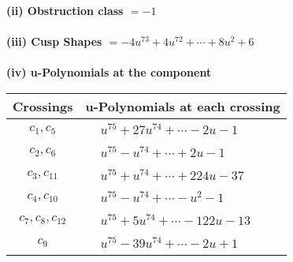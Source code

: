 \documentclass[1p]{elsarticle_modified}
\theoremstyle{definition}
\begin{document}
\flushleft \textbf{(ii) Obstruction class $= -1$}\\~\\
\flushleft \textbf{(iii) Cusp Shapes $= -4 u^{73}+4 u^{72}+\cdots+8 u^2+6$}\\~\\
\newpage\renewcommand{\arraystretch}{1}
\flushleft \textbf{(iv) u-Polynomials at the component}\newline \\
\begin{tabular}{m{50pt}|m{274pt}}
Crossings & \hspace{64pt}u-Polynomials at each crossing \\
\hline $$\begin{aligned}c_{1},c_{5}\end{aligned}$$&$\begin{aligned}
&u^{75}+27 u^{74}+\cdots-2 u-1
\end{aligned}$\\
\hline $$\begin{aligned}c_{2},c_{6}\end{aligned}$$&$\begin{aligned}
&u^{75}- u^{74}+\cdots+2 u-1
\end{aligned}$\\
\hline $$\begin{aligned}c_{3},c_{11}\end{aligned}$$&$\begin{aligned}
&u^{75}+u^{74}+\cdots+224 u-37
\end{aligned}$\\
\hline $$\begin{aligned}c_{4},c_{10}\end{aligned}$$&$\begin{aligned}
&u^{75}- u^{74}+\cdots- u^2-1
\end{aligned}$\\
\hline $$\begin{aligned}c_{7},c_{8},c_{12}\end{aligned}$$&$\begin{aligned}
&u^{75}+5 u^{74}+\cdots-122 u-13
\end{aligned}$\\
\hline $$\begin{aligned}c_{9}\end{aligned}$$&$\begin{aligned}
&u^{75}-39 u^{74}+\cdots-2 u+1
\end{aligned}$\\
\hline
\end{tabular}\\~\\
\end{document}
